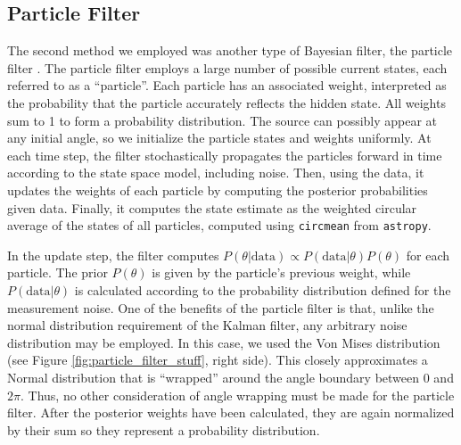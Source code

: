 \documentclass[11pt]{amsart}
\begin{document}
\subsection{Particle Filter}
The second method we employed was another type of Bayesian filter, the particle filter \cite{Particle}. The particle filter employs a large number of possible current states, each referred to 
as a “particle”. Each particle has an associated weight, interpreted as the probability that the particle accurately reflects the hidden state. All weights sum to 1 to form a probability distribution. The source can possibly 
appear at any initial angle, so we initialize the particle states and weights uniformly. At each time step, the filter stochastically propagates the particles forward in time according to the state space 
model, including noise. Then, using the data, it updates the weights of each particle by computing the posterior probabilities given data. Finally, it computes the state estimate 
as the weighted circular average of the states of all particles, computed using \lstinline{circmean} from \lstinline{astropy}. 

In the update step, the filter computes $P(\theta|\text{data}) \propto P(\text{data}|\theta)P(\theta)$ for each particle. The prior $P(\theta)$ is given by the particle’s previous weight, while $P(\text{data}|\theta)$ is calculated 
according to the probability distribution defined for the measurement noise. One of the benefits of the particle filter is that, unlike the normal distribution requirement of the Kalman filter, any arbitrary noise 
distribution may be employed. In this case, we used the Von Mises distribution (see Figure \ref{fig:particle_filter_stuff}, right side). This closely approximates a Normal distribution 
that is “wrapped” around the angle boundary between $0$ and $2\pi$. Thus, no other consideration of angle wrapping must be made for the particle filter. After the posterior weights have been calculated, they are again normalized by 
their sum so they represent a probability distribution.
\end{document}
